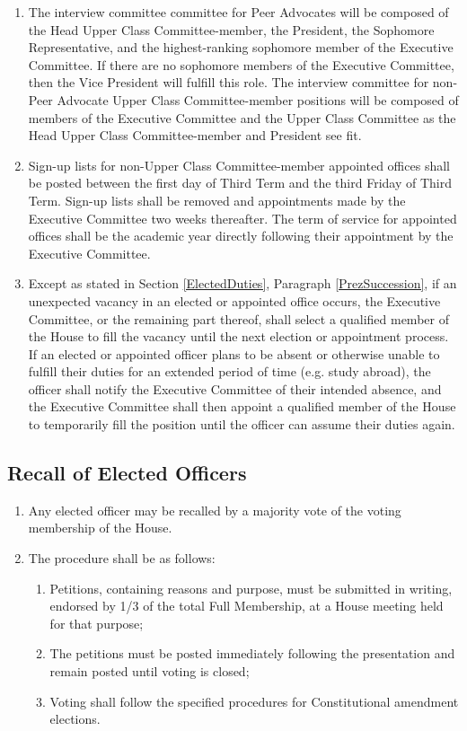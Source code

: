 \documentclass[10pt]{article} %
\begin{document}
\begin{enumerate}
\item The interview committee committee for Peer Advocates will be composed of the Head Upper Class Committee-member, the President, the Sophomore Representative, and the highest-ranking sophomore member of the Executive Committee. If there are no sophomore members of the Executive Committee, then the Vice President will fulfill this role. The interview committee for non-Peer Advocate Upper Class Committee-member positions will be composed of members of the Executive Committee and the Upper Class Committee as the Head Upper Class Committee-member and President see fit.
\item Sign-up lists for non-Upper Class Committee-member appointed offices shall be posted between the first day of Third Term and the third Friday of Third Term. Sign-up lists shall be removed and appointments made by the Executive Committee two weeks thereafter. The term of service for appointed offices shall be the academic year directly following their appointment by the Executive Committee.
\item \label{Vacancy} Except as stated in Section \ref{ElectedDuties}, Paragraph \ref{PrezSuccession}, if an unexpected vacancy in an elected or appointed office occurs, the Executive Committee, or the remaining part thereof, shall select a qualified member of the House to fill the vacancy until the next election or appointment process. If an elected or appointed officer plans to be absent or otherwise unable to fulfill their duties for an extended period of time (e.g. study abroad), the officer shall notify the Executive Committee of their intended absence, and the Executive Committee shall then appoint a qualified member of the House to temporarily fill the position until the officer can assume their duties again.
\end{enumerate}
\subsection{Recall of Elected Officers}
\begin{enumerate}
\item Any elected officer may be recalled by a majority vote of the voting membership of the House. 
\item The procedure shall be as follows:
\begin{enumerate}
\item Petitions, containing reasons and purpose, must be submitted in writing, endorsed by 1/3 of the total Full Membership, at a House meeting held for that purpose;
\item The petitions must be posted immediately following the presentation and remain posted until voting is closed;
\item Voting shall follow the specified procedures for Constitutional amendment elections.
\end{enumerate}
\end{enumerate}
\end{document}
